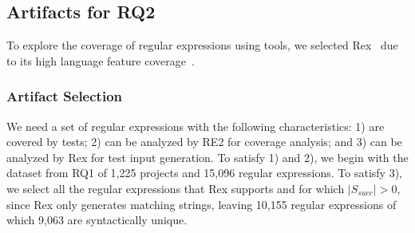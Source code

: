 


\subsection{Artifacts for RQ2}
\label{rq2:artifacts}




To explore the coverage of regular expressions using tools, we selected Rex~\cite{rex} due to its high language feature coverage~\cite{chapman2016}.


\subsubsection{Artifact Selection}

We need a set of regular expressions with the following characteristics: 1) are covered by tests; 2) can be analyzed by RE2 for coverage analysis; and 3) can be analyzed by Rex for test input generation. To satisfy 1) and 2), we begin with the dataset from RQ1 of 1,225 projects and 15,096 regular expressions. To satisfy 3), we select all the regular expressions that Rex supports and for which $\lvert S_{succ} \rvert > 0$, since Rex only generates matching strings, leaving 10,155 regular expressions of which 9,063 are syntactically unique. 

